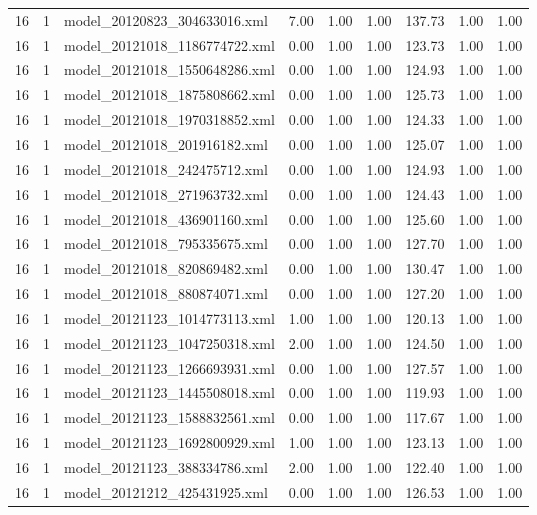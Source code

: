 \begin{table}[ht]
\begin{tabular}{rrlrrrrrr}
   16 &   1 & model\_20120823\_304633016.xml & 7.00 & 1.00 & 1.00 & 137.73 & 1.00 & 1.00 \\ 
   16 &   1 & model\_20121018\_1186774722.xml & 0.00 & 1.00 & 1.00 & 123.73 & 1.00 & 1.00 \\ 
   16 &   1 & model\_20121018\_1550648286.xml & 0.00 & 1.00 & 1.00 & 124.93 & 1.00 & 1.00 \\ 
   16 &   1 & model\_20121018\_1875808662.xml & 0.00 & 1.00 & 1.00 & 125.73 & 1.00 & 1.00 \\ 
   16 &   1 & model\_20121018\_1970318852.xml & 0.00 & 1.00 & 1.00 & 124.33 & 1.00 & 1.00 \\ 
   16 &   1 & model\_20121018\_201916182.xml & 0.00 & 1.00 & 1.00 & 125.07 & 1.00 & 1.00 \\ 
   16 &   1 & model\_20121018\_242475712.xml & 0.00 & 1.00 & 1.00 & 124.93 & 1.00 & 1.00 \\ 
   16 &   1 & model\_20121018\_271963732.xml & 0.00 & 1.00 & 1.00 & 124.43 & 1.00 & 1.00 \\ 
   16 &   1 & model\_20121018\_436901160.xml & 0.00 & 1.00 & 1.00 & 125.60 & 1.00 & 1.00 \\ 
   16 &   1 & model\_20121018\_795335675.xml & 0.00 & 1.00 & 1.00 & 127.70 & 1.00 & 1.00 \\ 
   16 &   1 & model\_20121018\_820869482.xml & 0.00 & 1.00 & 1.00 & 130.47 & 1.00 & 1.00 \\ 
   16 &   1 & model\_20121018\_880874071.xml & 0.00 & 1.00 & 1.00 & 127.20 & 1.00 & 1.00 \\ 
   16 &   1 & model\_20121123\_1014773113.xml & 1.00 & 1.00 & 1.00 & 120.13 & 1.00 & 1.00 \\ 
   16 &   1 & model\_20121123\_1047250318.xml & 2.00 & 1.00 & 1.00 & 124.50 & 1.00 & 1.00 \\ 
   16 &   1 & model\_20121123\_1266693931.xml & 0.00 & 1.00 & 1.00 & 127.57 & 1.00 & 1.00 \\ 
   16 &   1 & model\_20121123\_1445508018.xml & 0.00 & 1.00 & 1.00 & 119.93 & 1.00 & 1.00 \\ 
   16 &   1 & model\_20121123\_1588832561.xml & 0.00 & 1.00 & 1.00 & 117.67 & 1.00 & 1.00 \\ 
   16 &   1 & model\_20121123\_1692800929.xml & 1.00 & 1.00 & 1.00 & 123.13 & 1.00 & 1.00 \\ 
   16 &   1 & model\_20121123\_388334786.xml & 2.00 & 1.00 & 1.00 & 122.40 & 1.00 & 1.00 \\ 
   16 &   1 & model\_20121212\_425431925.xml & 0.00 & 1.00 & 1.00 & 126.53 & 1.00 & 1.00 \\ 

\end{tabular}
\end{table}
